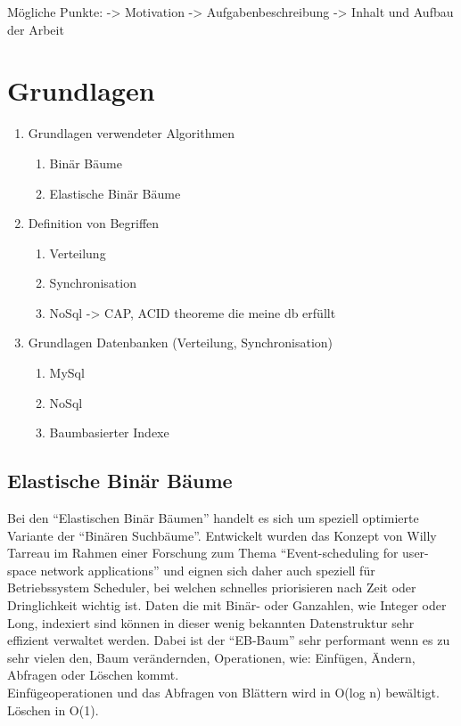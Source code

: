 \documentclass[a4paper,11pt,oneside,%
headsepline,												%
footsepline,												%
bibtotocnumbered									%
]{scrreprt}
\begin{document}
	Mögliche Punkte:
	-> Motivation
	-> Aufgabenbeschreibung
	-> Inhalt und Aufbau der Arbeit	
		
\chapter{Grundlagen}

	\begin{enumerate}[1.]
			\item Grundlagen verwendeter Algorithmen
				\begin{enumerate}[1.]
					\item Binär Bäume
					\item Elastische Binär Bäume
				\end{enumerate}
			\item Definition von Begriffen
				\begin{enumerate}[1.]
					\item Verteilung
					\item Synchronisation
					\item NoSql -> CAP, ACID theoreme die meine db erfüllt 
				\end{enumerate}
			\item Grundlagen Datenbanken (Verteilung, Synchronisation)
				\begin{enumerate}[1.]
					\item MySql
					\item NoSql 
					\item Baumbasierter Indexe
				\end{enumerate}
	\end{enumerate}

\section{Elastische Binär Bäume}
\label{sec:ebTreeGrundlagen}
Bei den \enquote{Elastischen Binär Bäumen} handelt es sich um speziell optimierte Variante der \enquote{Binären Suchbäume}. Entwickelt wurden das Konzept von Willy Tarreau\autocite{Tarreau} im Rahmen einer Forschung zum Thema \enquote{Event-scheduling for user-space network applications} und eignen sich daher auch speziell für Betriebssystem Scheduler, bei welchen schnelles priorisieren nach Zeit oder Dringlichkeit wichtig ist. Daten die mit Binär- oder Ganzahlen, wie Integer oder Long, indexiert sind können in dieser wenig bekannten Datenstruktur sehr effizient verwaltet werden. Dabei ist der \enquote{\ac{EB-Baum}} sehr performant wenn es zu sehr vielen den, Baum verändernden, Operationen, wie: Einfügen, Ändern, Abfragen oder Löschen kommt.\\
Einfügeoperationen und das Abfragen von Blättern wird in O(log n) bewältigt. Löschen in O(1).\\
\end{document}
